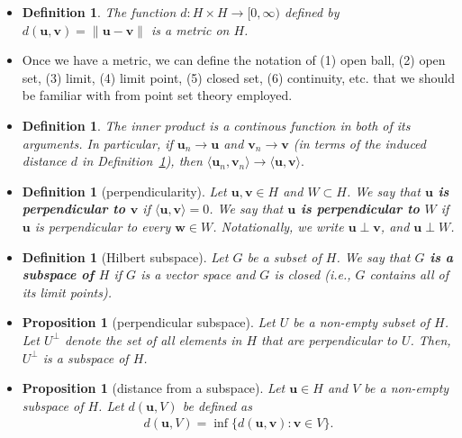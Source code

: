 \documentclass[10pt]{article}
\newtheorem{definition}[lemma]{Definition}
\newtheorem{proposition}[lemma]{Proposition}
\numberwithin{lemma}{section}
\newcommand{\ve}[1]{\mathbf{#1}}
\begin{document}
\begin{itemize}
  \item \begin{definition} \label{def:metric}
    The function $d: H \times H \rightarrow [0,\infty)$ defined by $d(\ve{u},\ve{v}) = \| \ve{u} - \ve{v} \|$ is a metric on $H$.
  \end{definition}

  \item Once we have a metric, we can define the notation of (1) open ball, (2) open set, (3) limit, (4) limit point, (5) closed set, (6) continuity, etc. that we should be familiar with from point set theory employed.
  
  \item \begin{definition}
    The inner product is a continous function in both of its arguments. In particular, if $\ve{u}_n \rightarrow \ve{u}$ and $\ve{v}_n \rightarrow \ve{v}$ (in terms of the induced distance $d$ in Definition~\ref{def:metric}), then $\langle \ve{u}_n, \ve{v}_n \rangle \rightarrow \langle \ve{u}, \ve{v} \rangle.$
  \end{definition}

  \item \begin{definition}[perpendicularity]
    Let $\ve{u}, \ve{v} \in H$ and $W \subset H$. We say that {\bf $\ve{u}$ is perpendicular to $\ve{v}$} if $\langle \ve{u}, \ve{v} \rangle = 0$. We say that {\bf $\ve{u}$ is perpendicular to $W$} if $\ve{u}$ is perpendicular to every $\ve{w} \in W$. Notationally, we write $\ve{u} \perp \ve{v}$, and $\ve{u} \perp W$.
  \end{definition}

  \item \begin{definition}[Hilbert subspace]
    Let $G$ be a subset of $H$. We say that {\bf $G$ is a subspace of $H$} if $G$ is a vector space and $G$ is closed (i.e., $G$ contains all of its limit points).
  \end{definition}

  \item \begin{proposition}[perpendicular subspace]
    Let $U$ be a non-empty subset of $H$. Let $U^\perp$ denote the set of all elements in $H$ that are perpendicular to $U$. Then, $U^\perp$ is a subspace of $H$. 
  \end{proposition}

  \item \begin{proposition}[distance from a subspace]
    Let $\ve{u} \in H$ and $V$ be a non-empty subspace of $H$. Let $d(\ve{u}, V)$ be defined as
    \begin{align*}
      d(\ve{u}, V) = \inf \{  d(\ve{u}, \ve{v}) : \ve{v} \in V \}.
    \end{align*}
  \end{proposition}


\end{itemize}
\end{document}

